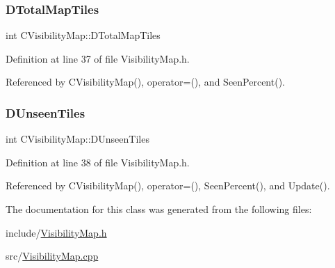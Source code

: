 \subsubsection{\texorpdfstring{D\+Total\+Map\+Tiles}{DTotalMapTiles}}
{\footnotesize\ttfamily int C\+Visibility\+Map\+::\+D\+Total\+Map\+Tiles\hspace{0.3cm}{\ttfamily [protected]}}



Definition at line 37 of file Visibility\+Map.\+h.



Referenced by C\+Visibility\+Map(), operator=(), and Seen\+Percent().

\hypertarget{classCVisibilityMap_a117ff39fef73ffd4cc4ba35c35e63171}{}\label{classCVisibilityMap_a117ff39fef73ffd4cc4ba35c35e63171} 
\subsubsection{\texorpdfstring{D\+Unseen\+Tiles}{DUnseenTiles}}
{\footnotesize\ttfamily int C\+Visibility\+Map\+::\+D\+Unseen\+Tiles\hspace{0.3cm}{\ttfamily [protected]}}



Definition at line 38 of file Visibility\+Map.\+h.



Referenced by C\+Visibility\+Map(), operator=(), Seen\+Percent(), and Update().



The documentation for this class was generated from the following files\+:\begin{DoxyCompactItemize}
\item 
include/\hyperlink{VisibilityMap_8h}{Visibility\+Map.\+h}\item 
src/\hyperlink{VisibilityMap_8cpp}{Visibility\+Map.\+cpp}\end{DoxyCompactItemize}
